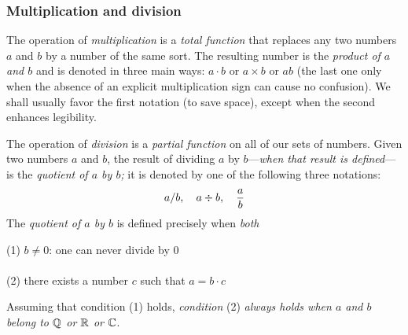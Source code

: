 
\subsubsection{Multiplication and division}
 
 
 

The operation of {\it multiplication} is a {\em total function} that replaces any two numbers $a$ and $b$ by a number of the same sort.  The resulting number is the {\em product of $a$ and $b$} and is denoted in three main ways: $a \cdot b$ or $a \times b$ or $ab$ (the last one only when the absence of an explicit multiplication sign can cause no confusion).  We shall usually favor the first notation (to save space), except when the second enhances legibility.

\smallskip

 
 
 

The operation of {\it division} is a {\em partial function} on all of our sets of numbers.  Given two numbers $a$ and $b$, the result of dividing $a$ by $b$---{\em when that result is defined}---is the {\it quotient of $a$ by $b$;} it is denoted by one of the following three notations:
\[  a/b, \ \ \ a \div b, \ \ \ {a \over b}  \]
The {\it quotient of $a$ by $b$} is defined precisely when {\em both}

\smallskip

\noindent
\hspace*{.35in}(1) $b \neq 0$: one can never divide by $0$ \\
\hspace*{.35in}{\em and} \\
\hspace*{.35in}(2) there exists a number $c$ such that $a = b \cdot c$

\smallskip

\noindent
Assuming that condition (1) holds, {\em condition} (2) {\em always holds when $a$ and $b$ belong to $\mathbb{Q}$ or $\mathbb{R}$ or $\mathbb{C}$}.

